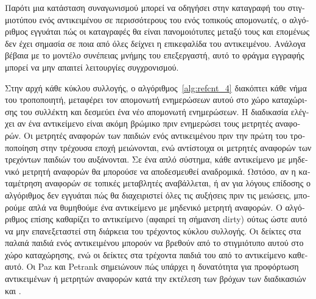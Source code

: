 \begin{greek}
Παρότι μια κατάσταση συναγωνισμού μπορεί να οδηγήσει στην
καταγραφή του στιγμιοτύπου ενός αντικειμένου σε περισσότερους
του ενός τοπικούς απομονωτές, ο αλγόριθμος εγγυάται πώς οι
καταγραφές θα είναι πανομοιότυπες μεταξύ τους και επομένως
δεν έχει σημασία σε ποια από όλες δείχνει η επικεφαλίδα του
αντικειμένου. Ανάλογα βέβαια με το μοντέλο συνέπειας μνήμης
του επεξεργαστή, αυτό το φράγμα εγγραφής μπορεί να μην απαιτεί
λειτουργίες συγχρονισμού.

Στην αρχή κάθε κύκλου συλλογής, ο αλγόριθμος~\ref{alg:refcnt_4} διακόπτει κάθε
νήμα του τροποποιητή, μεταφέρει τον απομονωτή ενημερώσεων
αυτού στο χώρο καταχώρισης του συλλέκτη και δεσμεύει ένα νέο
απομονωτή ενημερώσεων. Η διαδικασία \textenglish{}
ελέγχει αν ένα αντικείμενο είναι ακόμη βρώμικο πριν ενημερώσει
τους μετρητές αναφορών. Οι μετρητές αναφορών των παιδιών ενός
αντικειμένου πριν την πρώτη του τροποποίηση στην τρέχουσα
εποχή μειώνονται, ενώ αντίστοιχα οι μετρητές αναφορών των
τρεχόντων παιδιών του αυξάνονται. Σε ένα απλό σύστημα, κάθε
αντικείμενο με μηδενικό μετρητή αναφορών θα μπορούσε να
αποδεσμευθεί αναδρομικά. Ωστόσο, αν η καταμέτρηση αναφορών
σε τοπικές μεταβλητές αναβάλλεται, ή αν για λόγους επίδοσης
ο αλγόριθμος δεν εγγυάται πώς θα διαχειριστεί όλες τις αυξήσεις
πριν τις μειώσεις, μπορούμε απλά να θυμηθούμε ένα αντικείμενο
με μηδενικό μετρητή αναφορών. Ο αλγόριθμος επίσης καθαρίζει
το αντικείμενο (αφαιρεί τη σήμανση dirty) ούτως ώστε αυτό να
μην επανεξεταστεί στη διάρκεια του τρέχοντος κύκλου συλλογής.
Οι δείκτες στα παλαιά παιδιά ενός αντικειμένου μπορούν να
βρεθούν από το στιγμιότυπο αυτού στο χώρο καταχώρησης, ενώ οι
δείκτες στα τρέχοντα παιδιά του από το αντικείμενο καθεαυτό.
Οι Paz και Petrank σημειώνουν \cite{DBLP:conf/cc/PazP07} πώς
υπάρχει η δυνατότητα για προφόρτωση αντικειμένων ή μετρητών
αναφορών κατά την εκτέλεση των βρόχων των διαδικασιών
\textenglish{} και \textenglish{}.


\end{greek}

